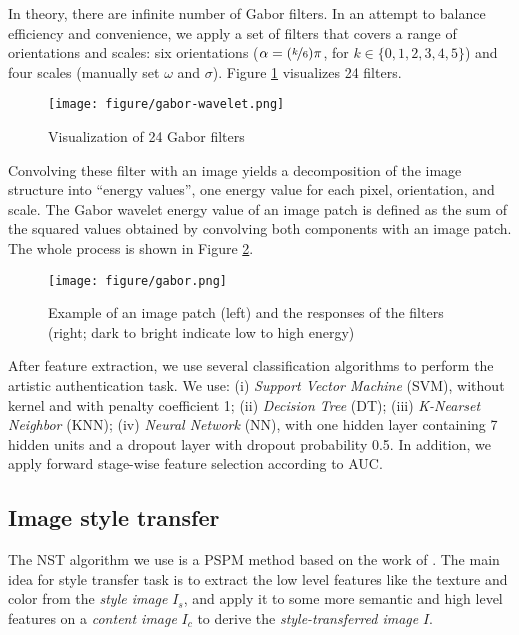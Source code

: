 \documentclass{article}
\begin{document}
In theory, there are infinite number of Gabor filters. 
In an attempt to balance efficiency and convenience, we apply a set of filters that covers a range of orientations and scales: six orientations ($\alpha=(\nicefrac{k}{6})\pi$, for $k\in\{0,1,2,3,4,5\}$) and four scales (manually set $\omega$ and $\sigma$). 
Figure \ref{fig:gabor-wavelet} visualizes 24 filters.

\begin{figure}[htb]
  \centering
  \texttt{[image: figure/gabor-wavelet.png]}
  \caption{Visualization of 24 Gabor filters~\citep{johnson2008image}}
  \label{fig:gabor-wavelet}
\end{figure}

Convolving these filter with an image yields a decomposition of the image structure into ``energy values'', one energy value for each pixel, orientation, and scale. 
The Gabor wavelet energy value of an image patch is defined as the sum of the squared values obtained by convolving both components with an image patch. The whole process is shown in Figure \ref{fig:gabor}.

\begin{figure}[htb]
  \centering
  \texttt{[image: figure/gabor.png]}
  \caption{Example of an image patch (left) and the responses of the filters (right; dark to bright indicate low to high energy)~\citep{johnson2008image}}
  \label{fig:gabor}
\end{figure}

After feature extraction, we use several classification algorithms to perform the artistic authentication task. We use: (i) \textit{Support Vector Machine} (SVM), without kernel and with penalty coefficient 1; (ii) \textit{Decision Tree} (DT); (iii) \textit{K-Nearset Neighbor} (KNN); (iv) \textit{Neural Network} (NN), with one hidden layer containing 7 hidden units and a dropout layer with dropout probability 0.5. In addition, we apply forward stage-wise feature selection according to AUC.

\subsection{Image style transfer}

The NST algorithm we use is a PSPM method based on the work of \citet{gatys2015neural,johnson2016perceptual,ulyanov2017improved}. 
The main idea for style transfer task is to extract the low level features like the texture and color from the \textit{style image} $I_s$, 
and apply it to some more semantic and high level features on a \textit{content image} $I_c$ to derive the \textit{style-transferred image} $I$. 
\end{document}
